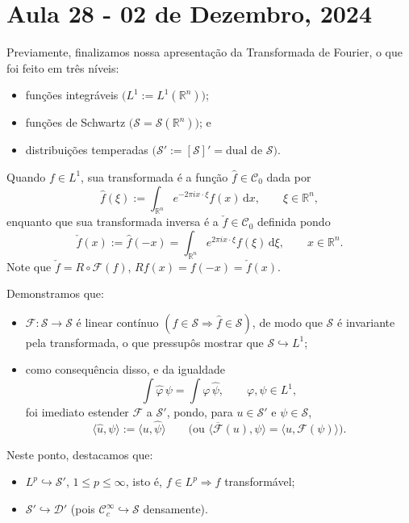 \documentclass[../distribution_theory_notes.tex]{subfiles}
\begin{document}
\section{Aula 28 - 02 de Dezembro, 2024}

Previamente, finalizamos nossa apresentação da Transformada de Fourier, o que foi feito em três níveis:
\begin{itemize}
	\item[(1$^\circ$)] funções integráveis \(\bigl(L^1:=L^1(\mathbb{R}^n)\bigr)\);
	\item[(2$^\circ$)] funções de Schwartz \(\bigl(\mathcal{S}=\mathcal{S}(\mathbb{R}^n)\bigr)\); e
	\item[(3$^\circ$)] distribuições temperadas \(\bigl(\mathcal{S}':=[\mathcal{S}]'=\text{dual de }\mathcal{S}\bigr)\).
\end{itemize}

Quando \(f\in L^1\), sua transformada é a função \(\hat f\in \mathcal{C}_0\) dada por
\[
	\hat f(\xi):=\int_{\mathbb{R}^n}e^{-2\pi i x\cdot \xi}f(x)\,\mathrm{d}x,
	\qquad \xi\in\mathbb{R}^n,
\]
enquanto que sua transformada inversa é a \(\check f\in\mathcal{C}_0\) definida pondo
\[
	\check f(x):=\hat f(-x)=\int_{\mathbb{R}^n}e^{2\pi i x\cdot \xi}f(\xi)\,\mathrm{d}\xi,
	\qquad x\in\mathbb{R}^n.
\]
Note que \(\check f=R\circ\mathcal{F}(f)\), \(Rf(x)=f(-x)=\check f(x)\).

Demonstramos que:
\begin{itemize}
	\item[(i)] \(\mathcal{F}:\mathcal{S}\longrightarrow\mathcal{S}\) é linear contínuo \((f\in\mathcal{S}\Rightarrow\hat f\in\mathcal{S})\), de modo que \(\mathcal{S}\) é invariante pela transformada, o que pressupôs mostrar que \(\mathcal{S}\hookrightarrow L^1\);
	\item[(ii)] como consequência disso, e da igualdade
	      \[
		      \int \hat\varphi\,\psi=\int \varphi\,\hat\psi,
		      \qquad \varphi,\psi\in L^1,
	      \]
	      foi imediato estender \(\mathcal{F}\) a \(\mathcal{S}'\), pondo, para \(u\in\mathcal{S}'\) e \(\psi\in\mathcal{S}\),
	      \[
		      \langle \hat u,\psi\rangle:=\langle u,\hat\psi\rangle
		      \qquad
		      \bigl(\text{ou }\langle \overline{\mathcal{F}}(u),\psi\rangle
		      =\langle u,\mathcal{F}(\psi)\rangle\bigr).
	      \]
\end{itemize}

Neste ponto, destacamos que:
\begin{itemize}
	\item[(a)] \(L^p\hookrightarrow\mathcal{S}'\), \(1\leq p\leq\infty\), isto é, \(f\in L^p\Rightarrow f\) transformável;
	\item[(b)] \(\mathcal{S}'\hookrightarrow\mathcal{D}'\) (pois \(\mathcal{C}_c^\infty\hookrightarrow\mathcal{S}\) densamente).
\end{itemize}
\end{document}
